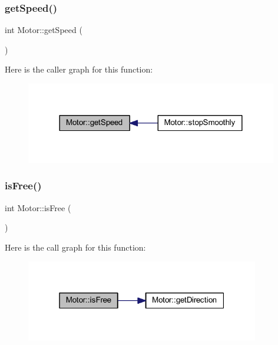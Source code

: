 \subsubsection{\texorpdfstring{get\+Speed()}{getSpeed()}}
{\footnotesize\ttfamily int Motor\+::get\+Speed (\begin{DoxyParamCaption}{ }\end{DoxyParamCaption})}

Here is the caller graph for this function\+:\nopagebreak
\begin{figure}[H]
\begin{center}
\leavevmode
\includegraphics[width=312pt]{class_motor_a4d03ea62bd9f5579d4fbe16d10462962_icgraph}
\end{center}
\end{figure}
\mbox{\label{class_motor_a17a9259b14a7e71ae625f47ec8ef0178}} 
\subsubsection{\texorpdfstring{is\+Free()}{isFree()}}
{\footnotesize\ttfamily int Motor\+::is\+Free (\begin{DoxyParamCaption}{ }\end{DoxyParamCaption})}

Here is the call graph for this function\+:\nopagebreak
\begin{figure}[H]
\begin{center}
\leavevmode
\includegraphics[width=289pt]{class_motor_a17a9259b14a7e71ae625f47ec8ef0178_cgraph}
\end{center}
\end{figure}
\mbox{\label{class_motor_a7429cc5bd67dd69077008674eda80f2d}} 
